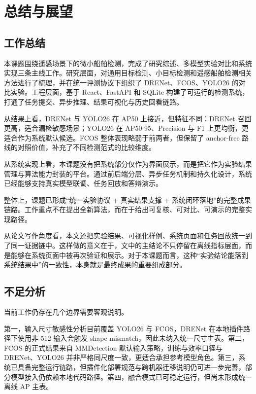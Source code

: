 
\chapter{总结与展望}
\label{ch:conclusion}

\section{工作总结}

本课题围绕遥感场景下的微小船舶检测，完成了研究综述、多模型实验对比和系统实现三条主线工作。研究层面，对通用目标检测、小目标检测和遥感船舶检测相关方法进行了梳理，并在统一评测协议下组织了 DRENet、FCOS、YOLO26 的对比实验。工程层面，基于 React、FastAPI 和 SQLite 构建了可运行的检测系统，打通了任务提交、异步推理、结果可视化与历史回看链路。

从结果上看，DRENet 与 YOLO26 在 AP50 上接近，但特征不同：DRENet 召回更高，适合漏检敏感场景；YOLO26 在 AP50-95、Precision 与 F1 上更均衡，更适合作为系统默认候选。FCOS 整体表现略弱于前两者，但保留了 anchor-free 路线的对照价值，补充了不同检测范式的比较维度。

从系统实现上看，本课题没有把系统部分仅作为界面展示，而是把它作为实验结果管理与算法能力封装的平台。通过前后端分层、异步任务机制和持久化设计，系统已经能够支持真实模型联调、任务回放和答辩演示。

整体上，课题已形成“统一实验协议 + 真实结果支撑 + 系统闭环落地”的完整成果链路。工作重点不在提出全新算法，而在于给出可复核、可对比、可演示的完整实现路径。

从论文写作角度看，本文还把实验结果、可视化样例、系统页面和任务回放统一到了同一证据链中。这样做的意义在于，文中的主结论不只停留在离线指标层面，而是能够在系统页面中被再次验证和展示。对于本课题而言，这种“实验结论能落到系统结果中”的一致性，本身就是最终成果的重要组成部分。

\section{不足分析}

当前工作仍存在几个边界需要客观说明。

第一，输入尺寸敏感性分析目前覆盖 YOLO26 与 FCOS，DRENet 在本地插件路径下使用非 512 输入会触发 shape mismatch，因此未纳入统一尺寸主表。第二，FCOS 的正式结果来自 MMDetection 默认输入策略，训练与效率口径与 DRENet、YOLO26 并非严格同尺度一致，更适合承担参考模型角色。第三，系统已具备完整运行链路，但插件化部署规范与跨机器迁移说明仍可进一步完善，部分模型接入仍依赖本地代码路径。第四，融合模式已可稳定运行，但尚未形成统一离线 AP 主表。

